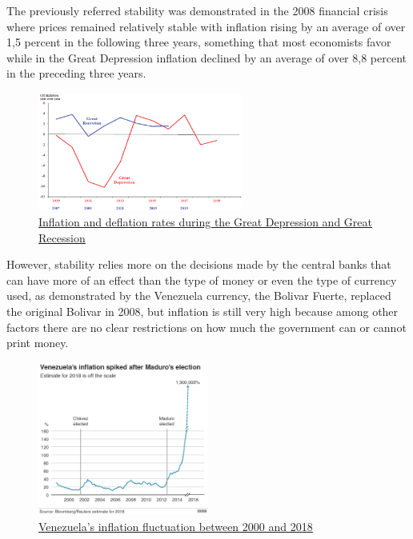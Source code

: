 \documentclass{article}
\begin{document}
The previously referred stability was demonstrated in the 2008 financial crisis where prices remained relatively stable with inflation rising by an average of over 1,5 percent in the following three years, something that most economists favor while in the Great Depression inflation declined by an average of over 8,8 percent in the preceding three years.

\begin{figure}[H]
    \begin{center}
        \includegraphics[width=0.6\textwidth]{images/inflation_deflation.png}
        \caption{\href{https://www.researchgate.net/figure/Inflation-and-deflation-rates-during-the-Great-Depression-and-Great-Recession_fig3_321576621}{\underline{Inflation and deflation rates during the Great Depression and Great Recession}}}
    \end{center}
\end{figure}


However, stability relies more on the decisions made by the central banks that can have more of an effect than the type of money or even the type of currency used, as demonstrated by the Venezuela currency, the Bolivar Fuerte, replaced the original Bolivar in 2008, but inflation is still very high because among other factors there are no clear restrictions on how much the government can or cannot print money.

\begin{figure}[H]
    \begin{center}
        \includegraphics[width=0.5\textwidth]{images/venezuela_inflation.png}
        \caption{\href{https://ichef.bbci.co.uk/news/640/cpsprodpb/7822/production/_105345703_venezuela-inflation_v3_976-nc.png}{\underline{Venezuela's inflation fluctuation between 2000 and 2018}}}
    \end{center}
\end{figure}
\end{document}
